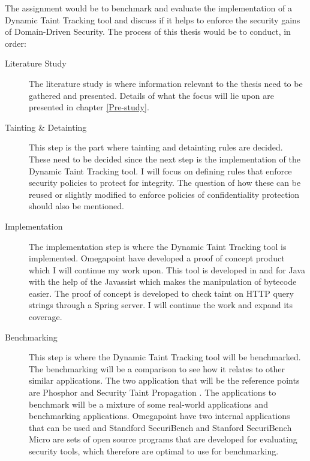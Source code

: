 \documentclass{../kththesis}
\begin{document}
	\noindent
	The assignment would be to benchmark and evaluate the implementation of a Dynamic Taint Tracking tool and discuss if it helps to enforce the security gains of Domain-Driven Security. The process of this thesis would be to conduct, in order:
	
	\begin{description}  
			\item [Literature Study]
			The literature study is where information relevant to the thesis need to be gathered and presented. Details of what the focus will lie upon are presented in chapter \ref{Pre-study}.
	
			\item [Tainting \& Detainting]
			This step is the part where tainting and detainting rules are decided. These need to be decided since the next step is the implementation of the Dynamic Taint Tracking tool. I will focus on defining rules that enforce security policies to protect for integrity. The question of how these can be reused or slightly modified to enforce policies of confidentiality protection should also be mentioned.
	
			\item [Implementation]
			The implementation step is where the Dynamic Taint Tracking tool is implemented. Omegapoint have developed a proof of concept product which I will continue my work upon. This tool is developed in and for Java with the help of the Javassist \parencite{Javassist} which makes the manipulation of bytecode easier. The proof of concept is developed to check taint on HTTP query strings through a Spring server. I will continue the work and expand its coverage.
	
	
			\item [Benchmarking]
			This step is where the Dynamic Taint Tracking tool will be benchmarked. The benchmarking will be a comparison to see how it relates to other similar applications. The two application that will be the reference points are Phosphor \parencite{phosphor} and Security Taint Propagation \parencite{securityTaint}. The applications to benchmark will be a mixture of some real-world applications and benchmarking applications. Omegapoint have two internal applications that can be used and Standford SecuriBench \parencite{securiBench} and Stanford SecuriBench Micro \parencite{securiBenchMicro} are sets of open source programs that are developed for evaluating security tools, which therefore are optimal to use for benchmarking.
			

\end{description}
\end{document}
